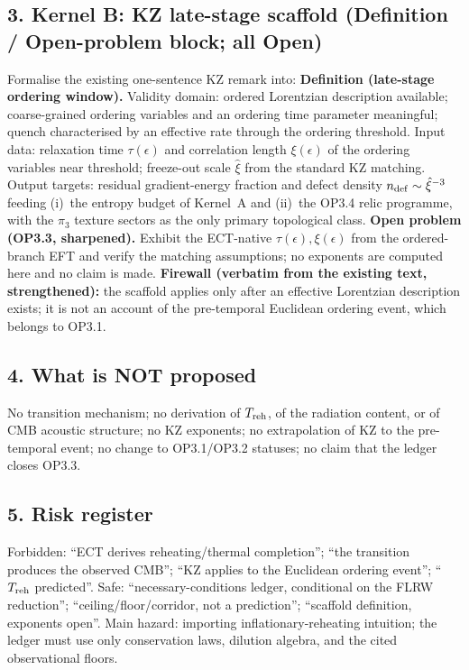 \subsection*{3. Kernel B: KZ late-stage scaffold (Definition /
Open-problem block; all Open)}
Formalise the existing one-sentence KZ remark into:
\textbf{Definition (late-stage ordering window).}
Validity domain: ordered Lorentzian description available;
coarse-grained ordering variables and an ordering time parameter
meaningful; quench characterised by an effective rate through the
ordering threshold.
Input data: relaxation time $\tau(\epsilon)$ and correlation
length $\xi(\epsilon)$ of the ordering variables near threshold;
freeze-out scale $\hat\xi$ from the standard KZ matching.
Output targets: residual gradient-energy fraction and defect
density $n_{\rm def}\sim\hat\xi^{-3}$ feeding (i)~the entropy
budget of Kernel~A and (ii)~the OP3.4 relic programme, with the
$\pi_3$ texture sectors as the only primary topological class.
\textbf{Open problem (OP3.3, sharpened).}
Exhibit the ECT-native $\tau(\epsilon),\xi(\epsilon)$ from the
ordered-branch EFT and verify the matching assumptions; no
exponents are computed here and no claim is made.
\textbf{Firewall (verbatim from the existing text, strengthened):}
the scaffold applies only after an effective Lorentzian
description exists; it is not an account of the pre-temporal
Euclidean ordering event, which belongs to OP3.1.

\subsection*{4. What is NOT proposed}
No transition mechanism; no derivation of $T_{\rm reh}$, of the
radiation content, or of CMB acoustic structure; no KZ exponents;
no extrapolation of KZ to the pre-temporal event; no change to
OP3.1/OP3.2 statuses; no claim that the ledger closes OP3.3.

\subsection*{5. Risk register}
Forbidden: ``ECT derives reheating/thermal completion'';
``the transition produces the observed CMB'';
``KZ applies to the Euclidean ordering event'';
``$T_{\rm reh}$ predicted''.
Safe: ``necessary-conditions ledger, conditional on the FLRW
reduction''; ``ceiling/floor/corridor, not a prediction'';
``scaffold definition, exponents open''.
Main hazard: importing inflationary-reheating intuition; the
ledger must use only conservation laws, dilution algebra, and the
cited observational floors.

